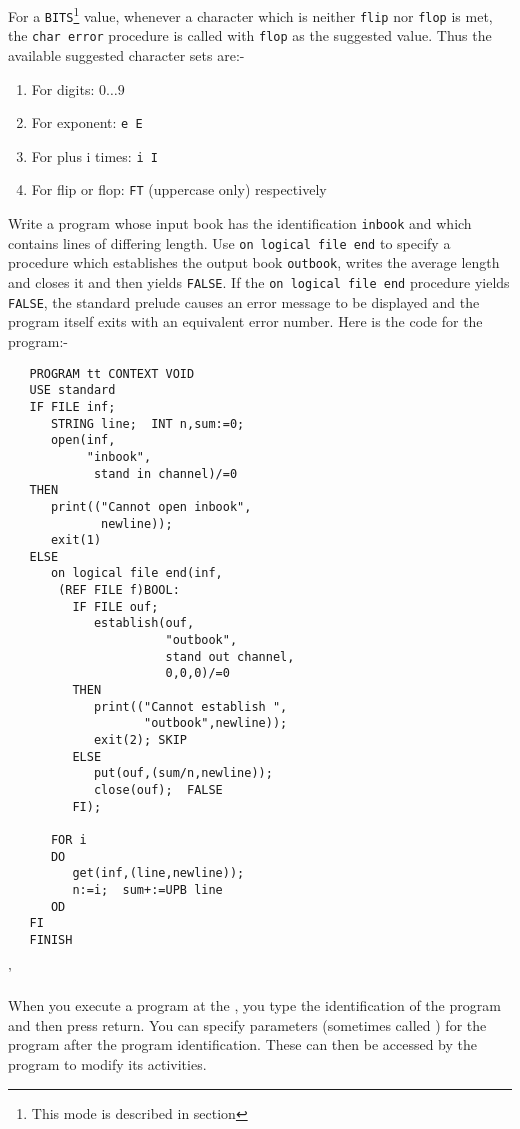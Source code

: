 For a \verb|BITS|\footnote{This mode is described in section
} value, whenever a character which is neither \verb|flip|
nor \verb|flop| is met, the \verb|char error| procedure is called
with \verb|flop| as the suggested value. Thus the available suggested
character sets are:-
\begin{enumerate}
\item For digits: $0\ldots9$
\item For exponent: \verb|e E| \
\item For plus i times: \verb|i I|
\item For flip or flop: \verb|FT| (uppercase only) respectively
\end{enumerate}

\begin{exercise}
\item Write a program whose input book has the identification
\verb|inbook| and which contains lines of differing length. Use
\verb|on logical file end| to specify a procedure which establishes
the output book \verb|outbook|, writes the average length and closes
it and then yields \verb|FALSE|. \ans If the
\verb|on logical file end| procedure yields\newline
\verb|FALSE|, the standard prelude causes an error message to be
displayed and the program itself exits with an equivalent error
number. Here is the code for the program:-
\begin{verbatim}
   PROGRAM tt CONTEXT VOID
   USE standard
   IF FILE inf;
      STRING line;  INT n,sum:=0;
      open(inf,
           "inbook",
            stand in channel)/=0
   THEN
      print(("Cannot open inbook",
             newline));
      exit(1)
   ELSE
      on logical file end(inf,
       (REF FILE f)BOOL:
         IF FILE ouf;
            establish(ouf,
                      "outbook",
                      stand out channel,
                      0,0,0)/=0
         THEN
            print(("Cannot establish ",
                   "outbook",newline));
            exit(2); SKIP
         ELSE
            put(ouf,(sum/n,newline));
            close(ouf);  FALSE
         FI);

      FOR i
      DO
         get(inf,(line,newline));
         n:=i;  sum+:=UPB line
      OD
   FI  
   FINISH
\end{verbatim}
'
\end{exercise}

When you execute a program at the , you type the
identification of the program and then press return.  You can specify
parameters (sometimes called \hx{\textbf{arguments}}{argument}) for
the program after the program identification.  These can then be
accessed by the program to modify its activities.

